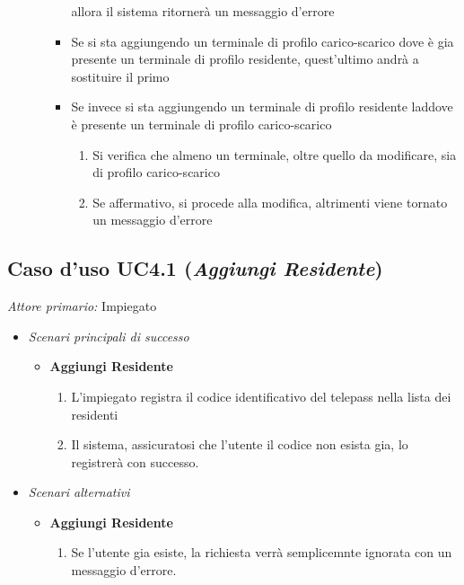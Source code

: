 \documentclass[12pt, letterpaper]{article}
\begin{document}
\begin{itemize}
\begin{itemize}
\begin{itemize}
            allora il sistema ritornerà un messaggio d'errore
            \item Se si sta aggiungendo un terminale di profilo
            carico-scarico dove è gia presente un terminale 
            di profilo residente, quest'ultimo andrà a 
            sostituire il primo
            \item Se invece si sta aggiungendo un terminale 
            di profilo residente laddove è presente un 
            terminale di profilo carico-scarico
            \begin{enumerate}
                \item Si verifica che almeno un terminale, 
                oltre quello da modificare, sia di profilo 
                carico-scarico 
                \item Se affermativo, si procede alla modifica, 
                altrimenti viene tornato un messaggio d'errore
            \end{enumerate}
        \end{itemize}
    \end{itemize}
\end{itemize}

\subsection{Caso d'uso UC4.1 (\emph{Aggiungi Residente})}
\emph{Attore primario: } Impiegato

\begin{itemize}
    \item \emph{Scenari principali di successo}
    \begin{itemize}
        \item \textbf{Aggiungi Residente}
        \begin{enumerate}
            \item L'impiegato registra il codice identificativo
            del telepass nella lista dei residenti
            \item Il sistema, assicuratosi che l'utente 
            il codice non esista gia, lo registrerà con successo.
        \end{enumerate}
    \end{itemize}

    \item \emph{Scenari alternativi}
    \begin{itemize}
        \item \textbf{Aggiungi Residente}
        \begin{enumerate}
            \item Se l'utente gia esiste, la richiesta verrà semplicemnte ignorata con un messaggio d'errore.
        \end{enumerate}
    \end{itemize}

\end{itemize}
\end{document}

